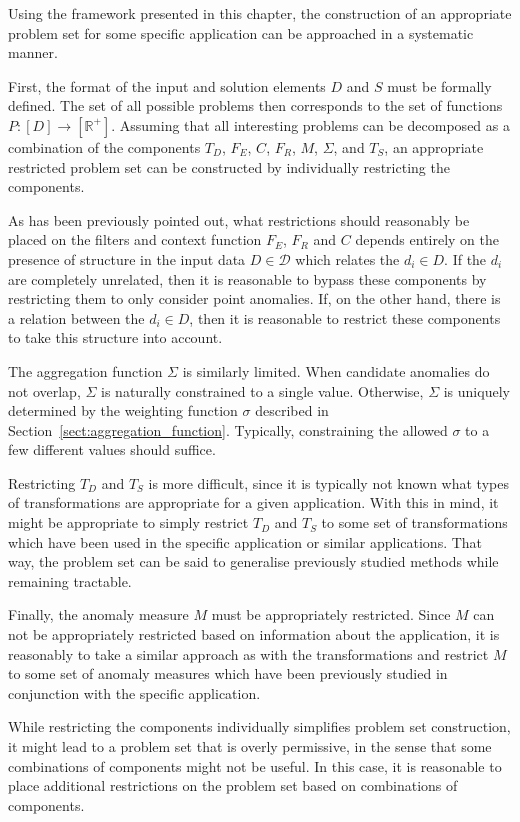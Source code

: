 Using the framework presented in this chapter, the construction of an appropriate problem set for some specific application can be approached in a systematic manner.

First, the format of the input and solution elements $D$ and $S$ must be formally defined. The set of all possible problems then corresponds to the set of functions $P: [D] \rightarrow [\mathbb{R}^+]$. Assuming that all interesting problems can be decomposed as a combination of the components $T_D$, $F_E$, $C$, $F_R$, $M$, $\Sigma$, and $T_S$, an appropriate restricted problem set can be constructed by individually restricting the components.

As has been previously pointed out, what restrictions should reasonably be placed on the filters and context function $F_E$, $F_R$ and $C$ depends entirely on the presence of structure in the input data $D \in \mathcal{D}$ which relates the $d_i \in D$. If the $d_i$ are completely unrelated, then it is reasonable to bypass these components by restricting them to only consider point anomalies. If, on the other hand, there is a relation between the $d_i \in D$, then it is reasonable to restrict these components to take this structure into account.

The aggregation function $\Sigma$ is similarly limited. When candidate anomalies do not overlap, $\Sigma$ is naturally constrained to a single value. Otherwise, $\Sigma$ is uniquely determined by the weighting function $\sigma$ described in Section~\ref{sect:aggregation_function}. Typically, constraining the allowed $\sigma$ to a few different values should suffice.

Restricting $T_D$ and $T_S$ is more difficult, since it is typically not known what types of transformations are appropriate for a given application. With this in mind, it might be appropriate to simply restrict $T_D$ and $T_S$ to some set of transformations which have been used in the specific application or similar applications. That way, the problem set can be said to generalise previously studied methods while remaining tractable.

Finally, the anomaly measure $M$ must be appropriately restricted. Since $M$ can not be appropriately restricted based on information about the application, it is reasonably to take a similar approach as with the transformations and restrict $M$ to some set of anomaly measures which have been previously studied in conjunction with the specific application.

While restricting the components individually simplifies problem set construction, it might lead to a problem set that is overly permissive, in the sense that some combinations of components might not be useful. In this case, it is reasonable to place additional restrictions on the problem set based on combinations of components.

